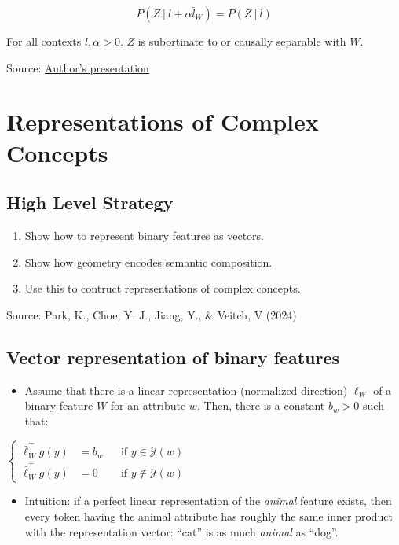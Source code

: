 \documentclass[
  letterpaper,
  DIV=11,
  numbers=noendperiod]{scrartcl}
\providecommand{\tightlist}{%
  \setlength{\itemsep}{0pt}\setlength{\parskip}{0pt}}\usepackage{longtable,booktabs,array}
\begin{document}
\[P(Z\ |\ l + \alpha \bar{l}_W) = P(Z\ |\ l)\]

For all contexts \(l, \alpha > 0\). \(Z\) is subortinate to or causally
separable with \(W\).

Source:
\href{https://kihopark.github.io/files/ICML\%202024\%20Workshop\%20keynote.pdf}{Author's
presentation}

\section{Representations of Complex
Concepts}\label{representations-of-complex-concepts}

\subsection{High Level Strategy}\label{high-level-strategy}

\begin{enumerate}
\def\labelenumi{\arabic{enumi}.}
\tightlist
\item
  Show how to represent binary features as vectors.
\item
  Show how geometry encodes semantic composition.
\item
  Use this to contruct representations of complex concepts.
\end{enumerate}

Source: Park, K., Choe, Y. J., Jiang, Y., \& Veitch, V (2024)

\subsection{Vector representation of binary
features}\label{vector-representation-of-binary-features}

\begin{itemize}
\tightlist
\item
  Assume that there is a linear representation (normalized direction)
  \(\bar{\ell}_W\) of a binary feature \(W\) for an attribute \(w\).
  Then, there is a constant \(b_w > 0\) such that:
\end{itemize}

\(\left\{
\begin{aligned}
\bar{\ell}_W^\top g(y) &= b_w && \text{if } y \in \mathcal{Y}(w) \\
\bar{\ell}_W^\top g(y) &= 0   && \text{if } y \notin \mathcal{Y}(w)
\end{aligned}
\right.\)

\begin{itemize}
\tightlist
\item
  Intuition: if a perfect linear representation of the \emph{animal}
  feature exists, then every token having the animal attribute has
  roughly the same inner product with the representation vector: ``cat''
  is as much \emph{animal} as ``dog''.
\end{itemize}
\end{document}
